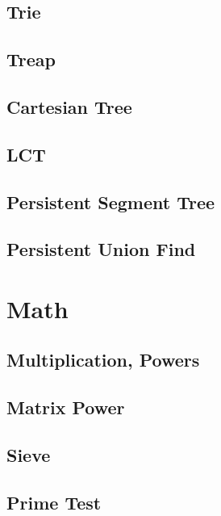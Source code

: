 \subsection{Trie}
\raggedbottom
\hrulefill
\subsection{Treap}
\raggedbottom
\hrulefill
\subsection{Cartesian Tree}
\raggedbottom
\hrulefill
\subsection{LCT}
\raggedbottom
\hrulefill
\subsection{Persistent Segment Tree}
\raggedbottom
\hrulefill
\subsection{Persistent Union Find}
\raggedbottom
\hrulefill

\section{Math}
\subsection{Multiplication, Powers}
\raggedbottom
\hrulefill
\subsection{Matrix Power}
\raggedbottom
\hrulefill
\subsection{Sieve}
\raggedbottom
\hrulefill
\subsection{Prime Test}
\raggedbottom
\hrulefill

